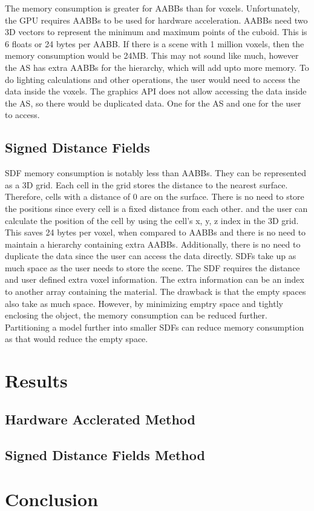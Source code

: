 \documentclass[12pt]{article}
\begin{document}
The memory consumption is greater for AABBs than for voxels.
Unfortunately, the GPU requires AABBs to be used for hardware acceleration.
AABBs need two 3D vectors to represent the minimum and maximum points of the cuboid.
This is 6 floats or 24 bytes per AABB.
If there is a scene with 1 million voxels, then the memory consumption would be 24MB.
This may not sound like much, however the AS has extra AABBs for the hierarchy, which will add upto more memory.
To do lighting calculations and other operations, the user would need to access the data inside the voxels.
The graphics API does not allow accessing the data inside the AS, so there would be duplicated data.
One for the AS and one for the user to access.

\subsection{Signed Distance Fields}

SDF memory consumption is notably less than AABBs.
They can be represented as a 3D grid. Each cell in the grid stores the distance to the nearest surface.
Therefore, cells with a distance of 0 are on the surface. There is no need to store the positions since
every cell is a fixed distance from each other. and the user can calculate the position of the cell by using the cell's x, y, z index in the 3D grid.
This saves 24 bytes per voxel, when compared to AABBs and there is no need to maintain a hierarchy containing extra AABBs.
Additionally, there is no need to duplicate the data since the user can access the data directly.
SDFs take up as much space as the user needs to store the scene. The SDF requires the distance and user defined extra voxel information.
The extra information can be an index to another array containing the material. 
The drawback is that the empty spaces also take as much space.
However, by minimizing emptry space and tightly enclosing the object, the memory consumption can be reduced further.
Partitioning a model further into smaller SDFs can reduce memory consumption as that would reduce the empty space.

\section{Results}

\subsection{Hardware Acclerated Method}
\subsection{Signed Distance Fields Method}

\section{Conclusion}

\printbibliography
\end{document}
